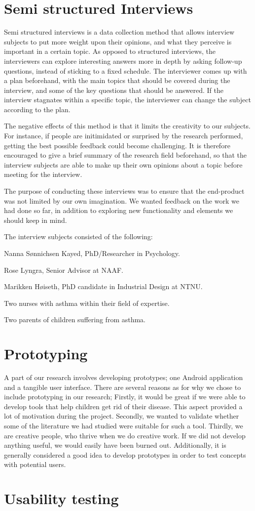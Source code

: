 \section{Semi structured Interviews}
\label{sec:semistructuredinterviews}

Semi structured interviews is a data collection method that allows interview subjects to put more weight upon their opinions, and what they perceive is important in a certain topic. As opposed to structured interviews, the interviewers can explore interesting answers more in depth by asking follow-up questions, instead of sticking to a fixed schedule. The interviewer comes up with a plan beforehand, with the main topics that should be covered during the interview, and some of the key questions that should be answered. If the interview stagnates within a specific topic, the interviewer can change the subject according to the plan.

The negative effects of this method is that it limits the creativity to our subjects. For instance, if people are initimidated or surprised by the research performed, getting the best possible feedback could become challenging. It is therefore encouraged to give a brief summary of the research field beforehand, so that the interview subjects are able to make up their own opinions about a topic before meeting for the interview.   

The purpose of conducting these interviews was to ensure that the end-product was not limited by our own imagination. We wanted feedback on the work we had done so far, in addition to exploring new functionality and elements we should keep in mind.

The interview subjects consisted of the following: 

Nanna S\o nnichsen Kayed, PhD/Researcher in Psychology.

Rose Lyngra, Senior Advisor at NAAF.

Marikken H\o iseth, PhD candidate in Industrial Design at NTNU. 

Two nurses with asthma within their field of expertise.

Two parents of children suffering from asthma.    


\section{Prototyping}
A part of our research involves developing prototypes; one Android application and a tangible user interface. There are several reasons as for why we chose to include prototyping in our research; Firstly, it would be great if we were able to develop tools that help children get rid of their disease. This aspect provided a lot of motivation during the project. Secondly, we wanted to validate whether some of the literature we had studied were suitable for such a tool. Thirdly, we are creative people, who thrive when we do creative work. If we did not develop anything useful, we would easily have been burned out. Additionally, it is generally considered a good idea to develop prototypes in order to test concepts with potential users\iref{}.
      
\section{Usability testing}
\label{sec:usabilitytesting}
 